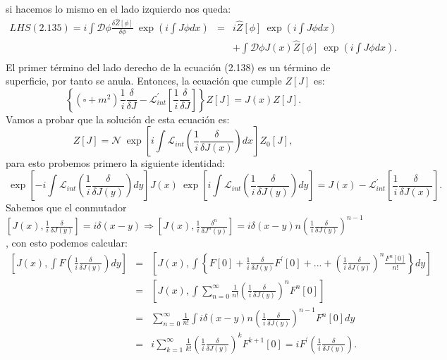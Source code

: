 si hacemos lo mismo en el lado izquierdo nos queda:
\begin{eqnarray}
\nonumber LHS(2.135)=i\int\mathcal{D}\phi\frac{\delta\hat{Z}[\phi]}{\delta\phi}\ \exp\left(i\int J\phi dx\right)&=& i\hat{Z}[\phi]\ \exp\left(i\int J\phi dx\right)\\
\nonumber &&+\int\mathcal{D}\phi J(x)\hat{Z}[\phi]\ \exp\left(i\int J\phi dx\right).\\
\end{eqnarray}
El primer término del lado derecho de la ecuación (2.138) es un término de superficie, por tanto se anula. Entonces, la ecuación que cumple $Z[J]$ es:
\begin{equation}
\left\{ (\square+m^{2})\frac{1}{i}\frac{\delta}{\delta J}-\mathcal{L}_{int}^{\prime}\left[\frac{1}{i}\frac{\delta}{\delta J}\right]\right\} Z[J]=J(x)Z[J].
\end{equation}
Vamos a probar que la solución de esta ecuación es:
\begin{equation}
Z[J]=\mathcal{N}\ \exp\left[i\int\mathcal{L}_{int}\left(\frac{1}{i}\frac{\delta}{\delta J(x)}\right)dx\right]Z_{0}[J],
\end{equation} 
para esto probemos primero la siguiente identidad:
\begin{equation}
\ \exp\left[-i\int\mathcal{L}_{int}\left(\frac{1}{i}\frac{\delta}{\delta J(y)}\right)dy\right]J(x)\ \exp\left[i\int\mathcal{L}_{int}\left(\frac{1}{i}\frac{\delta}{\delta J(y)}\right)dy\right]=J(x)-\mathcal{L}_{int}^{\prime}\left[\frac{1}{i}\frac{\delta}{\delta J(x)}\right] .
\end{equation}
Sabemos que el conmutador $\left[J(x),\frac{1}{i}\frac{\delta}{\delta J(y)}\right]=i\delta(x-y)\Rightarrow\left[J(x),\frac{1}{i}\frac{\delta^{n}}{\delta J^{n}(y)}\right]=i\delta(x-y)n\left(\frac{1}{i}\frac{\delta}{\delta J(y)}\right)^{n-1}$, con esto podemos calcular:
\begin{eqnarray}
\nonumber \left[J(x),\int F\left(\frac{1}{i}\frac{\delta}{\delta J(y)}\right)dy\right]&=&\left[J(x),\int\left\{ F[0]+\frac{1}{i}\frac{\delta}{\delta J(y)}F^{\prime}[0]+...+\left(\frac{1}{i}\frac{\delta}{\delta J(y)}\right)^{n}\frac{F^{n}[0]}{n!}\right\} dy\right]\\
\nonumber &=& \left[J(x),\int\sum_{n=0}^{\infty}\frac{1}{n!}\left(\frac{1}{i}\frac{\delta}{\delta J(y)}\right)^{n}F^{n}[0]\right]\\
\nonumber &=& \sum_{n=0}^{\infty}\frac{1}{n!}\int i\delta(x-y)n\left(\frac{1}{i}\frac{\delta}{\delta J(y)}\right)^{n-1}F^{n}[0]dy\\
&=& i\sum_{k=1}^{\infty}\frac{1}{k!}\left(\frac{1}{i}\frac{\delta}{\delta J(y)}\right)^{k}F^{k+1}[0]=iF^{\prime}\left(\frac{1}{i}\frac{\delta}{\delta J(y)}\right) .
\end{eqnarray}
